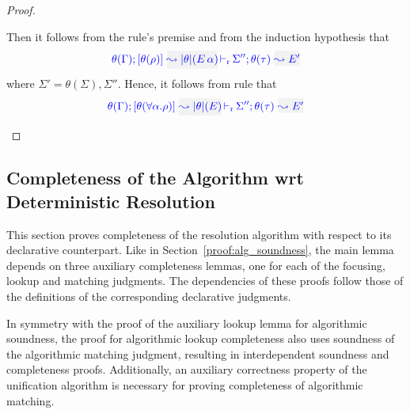\begin{proof}
\begin{description}
  Then it follows from the rule's premise and from the induction hypothesis that
\begin{equation*}
\dmres{\theta(\tenv)}{\theta(\rulet)}{\etrans\theta(\mmapp{E}{\alpha})}{\theta(\type)}{E'}{\Sigma''}
\end{equation*}
where $\Sigma' = \theta(\Sigma),\Sigma''$.
  Hence, it follows from rule  that
\begin{equation*}
  \dmres{\theta(\tenv)}{\theta(\tall{\alpha}{\rulet})}{\etrans\theta(E)}{\theta(\type)}{E'}{\Sigma''}
\end{equation*}
\end{description}
\end{proof}

%

\subsection{Completeness of the Algorithm wrt Deterministic Resolution}
\label{proof:alg_completeness}
This section proves completeness of the resolution algorithm with respect to its declarative
counterpart. Like in Section~\ref{proof:alg_soundness}, the main lemma depends on three auxiliary
completeness lemmas, one for each of the focusing, lookup and matching judgments.
The dependencies of these proofs follow those of the definitions of the
corresponding declarative judgments.

In symmetry with the proof of the auxiliary lookup lemma for algorithmic soundness,
the proof for algorithmic lookup completeness also uses soundness of the algorithmic matching
judgment, resulting in interdependent soundness and completeness proofs. Additionally,
an auxiliary correctness property of the unification algorithm is necessary for proving
completeness of algorithmic matching.

